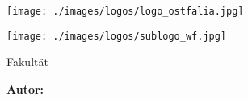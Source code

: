 
\frontmatter
\begin{titlepage}


    \thispagestyle{titlepage}

    \hspace{27.3em}
    \texttt{[image: ./images/logos/logo\_ostfalia.jpg]}

    \vspace{0em}

    \texttt{[image: ./images/logos/sublogo\_wf.jpg]}

    \vspace{0em}\hspace{0.2cm}
    \begin{minipage}{\dimexpr\textwidth-0.6cm\relax}
        {\Large{Fakultät \faculty}}
    \end{minipage}

    \vfil


    \hspace{0.2cm}
    \begin{minipage}{\dimexpr\textwidth-0.6cm\relax}
        \begin{center}
            \vspace{2em}

            {\Large\textbf{{\documentSubject}}}

            \vspace{2em}

            {\Huge\textbf{{\documentTitle}}}

            \vspace{2em}

            {\Large{\documentSubtitle}}

            \vspace{1em}
        \end{center}
    \end{minipage}


    \vfil

    \hspace{0.2cm}
    \begin{minipage}{\dimexpr\textwidth-0.6cm\relax}
        {\Large{\textbf{Autor:} \\\documentAuthor
            }}


\end{minipage}
\end{titlepage}
